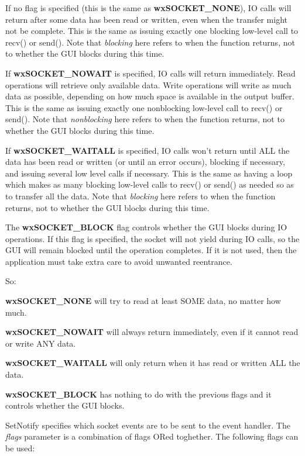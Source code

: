 If no flag is specified (this is the same as {\bf wxSOCKET\_NONE}),
IO calls will return after some data has been read or written, even
when the transfer might not be complete. This is the same as issuing
exactly one blocking low-level call to recv() or send(). Note that
{\it blocking} here refers to when the function returns, not to whether
the GUI blocks during this time.

If {\bf wxSOCKET\_NOWAIT} is specified, IO calls will return immediately.
Read operations will retrieve only available data. Write operations will
write as much data as possible, depending on how much space is available
in the output buffer. This is the same as issuing exactly one nonblocking
low-level call to recv() or send(). Note that {\it nonblocking} here
refers to when the function returns, not to whether the GUI blocks during
this time.

If {\bf wxSOCKET\_WAITALL} is specified, IO calls won't return until ALL
the data has been read or written (or until an error occurs), blocking if
necessary, and issuing several low level calls if necessary. This is the
same as having a loop which makes as many blocking low-level calls to
recv() or send() as needed so as to transfer all the data. Note that
{\it blocking} here refers to when the function returns, not to whether
the GUI blocks during this time.

The {\bf wxSOCKET\_BLOCK} flag controls whether the GUI blocks during
IO operations. If this flag is specified, the socket will not yield
during IO calls, so the GUI will remain blocked until the operation
completes. If it is not used, then the application must take extra
care to avoid unwanted reentrance.

So:

{\bf wxSOCKET\_NONE} will try to read at least SOME data, no matter how much.

{\bf wxSOCKET\_NOWAIT} will always return immediately, even if it cannot
read or write ANY data.

{\bf wxSOCKET\_WAITALL} will only return when it has read or written ALL
the data.

{\bf wxSOCKET\_BLOCK} has nothing to do with the previous flags and
it controls whether the GUI blocks.

%
%
\label{wxsocketbasesetnotify}


SetNotify specifies which socket events are to be sent to the event handler.
The {\it flags} parameter is a combination of flags ORed toghether. The
following flags can be used:

